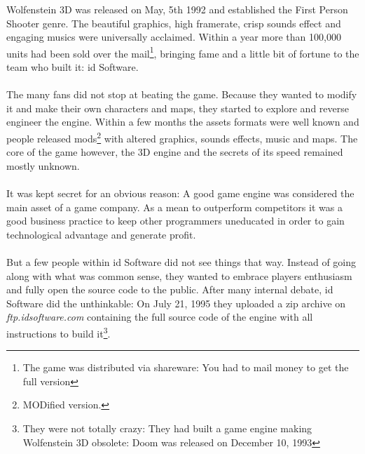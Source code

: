 Wolfenstein 3D was released on May, 5th 1992 and established the First Person Shooter genre. The beautiful graphics, high framerate, crisp sounds effect and engaging musics were universally acclaimed. Within a year more than 100,000 units had been sold over the mail\footnote{The game was distributed via shareware: You had to mail money to get the full version}, bringing fame and a little bit of fortune to the team who built it: id Software.\\
\\
The many fans did not stop at beating the game. Because they wanted to modify it and make their own characters and maps, they started to explore and reverse engineer the engine. Within a few months the assets formats were well known and people released mods\footnote{MODified version.} with altered graphics, sounds effects, music and maps. The core of the game however, the 3D engine and the secrets of its speed remained mostly unknown.\\
\\
It was kept secret for an obvious reason: A good game engine was considered the main asset of a game company. As a mean to outperform competitors it was a good business practice to keep other programmers  uneducated in order to gain technological advantage and generate profit.\\
\\
But a few people within id Software did not see things that way. Instead of going along with what was common sense, they wanted to embrace players enthusiasm and fully open the source code to the public. After many internal debate, id Software did the unthinkable: On July 21, 1995 they uploaded a zip archive on \emph{ftp.idsoftware.com} containing the full source code of the engine with all instructions to build it\footnote{They were not totally crazy: They had built a game engine making Wolfenstein 3D obsolete: Doom was released on December 10, 1993}.\\

